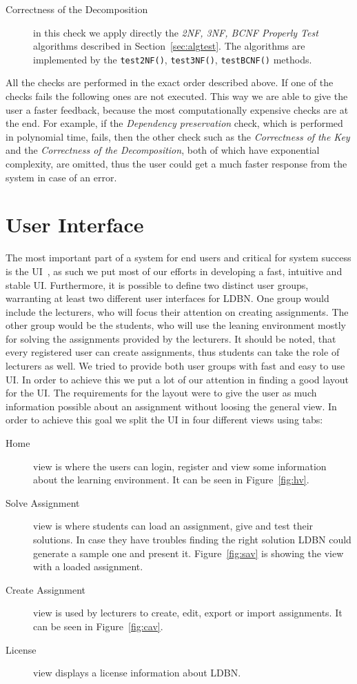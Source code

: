 \begin{description}
	\item [Correctness of the Decomposition] in this check we apply directly the 
		\textit{2NF, 3NF, BCNF Properly Test} algorithms described in 
		Section~\ref{sec:algtest}. The algorithms are implemented by the 
		\verb=test2NF()=, \verb=test3NF()=, \verb=testBCNF()= methods.
		
\end{description}

All the checks are performed in the exact order described above. If one of the checks fails the following ones
are not executed. This way we are able to give the user a faster feedback, because 
the most computationally expensive checks are at the end. For example, if the \textit{Dependency preservation}
check, which is performed in polynomial time, fails, then the other check such as the 
\textit{Correctness of the Key} and the \textit{Correctness of the Decomposition}, both of which 
have exponential complexity, are omitted, thus the user could get a much faster response from the system
in case of an error. 

\section{User Interface}
The most important part of a system for end users and critical for system 
success is the UI~\cite{p9}, as such we put most of
our efforts in developing a fast, intuitive and stable UI. Furthermore,
it is possible to define two distinct user groups, warranting at least two different
user interfaces for LDBN.  One group would include the lecturers, who will
focus their attention on creating assignments. The other group would be the 
students, who will use the leaning environment mostly for solving 
the assignments provided by the lecturers. It should be noted, that every registered
user can create assignments, thus students can take the role of lecturers as well.
We tried to provide both 
user groups with fast and easy to use UI. In order to achieve this we put a lot
of our attention in finding a good layout for the UI. The requirements for
the layout were to give the user as much information possible about an 
assignment without loosing the general view. In order to achieve this goal  
we split the UI in four different views using tabs:

\begin{description}
	\item[Home] view is where the users can login, register and view some information 
	about the learning environment. It can be seen in Figure~\ref{fig:hv}.
	\item[Solve Assignment] view is where students can load an assignment, give and
	test their solutions. In case they have troubles finding the right solution
	LDBN could generate a sample one and present it. Figure~\ref{fig:sav} is showing
	the view with a loaded assignment.
	\item[Create Assignment] view is used by lecturers to create, edit, export or import
	assignments. It can be seen in Figure~\ref{fig:cav}.
	\item[License] view displays a license information about LDBN.
\end{description} 

